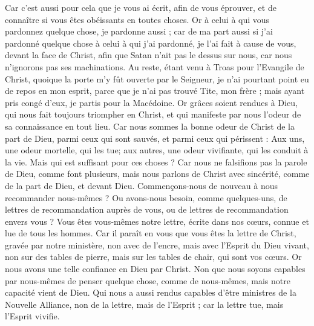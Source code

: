 \begin{multicols}{2}
Car c’est aussi pour cela que je vous ai écrit, afin de vous éprouver, et de connaître si vous êtes obéissants en toutes choses.
Or à celui à qui vous pardonnez quelque chose, je pardonne aussi ; car de ma part aussi si j'ai pardonné quelque chose à celui à qui j'ai pardonné, je l'ai fait à cause de vous, devant la face de Christ,
afin que Satan n'ait pas le dessus sur nous, car nous n'ignorons pas ses machinations.
Au reste, étant venu à Troas pour l'Evangile de Christ, quoique la porte m'y fût ouverte par le Seigneur, je n’ai pourtant point eu de repos en mon esprit, parce que je n'ai pas trouvé Tite, mon frère ;
mais ayant pris congé d'eux, je partis pour la Macédoine.
Or grâces soient rendues à Dieu, qui nous fait toujours triompher en Christ, et qui manifeste par nous l'odeur de sa connaissance en tout lieu.
Car nous sommes la bonne odeur de Christ de la part de Dieu, parmi ceux qui sont sauvés, et parmi ceux qui périssent :
Aux uns, une odeur mortelle, qui les tue; aux autres, une odeur vivifiante, qui les conduit à la vie. Mais qui est suffisant pour ces choses ?
Car nous ne falsifions pas la parole de Dieu, comme font plusieurs, mais nous parlons de Christ avec sincérité, comme de la part de Dieu, et devant Dieu.
\VerseOne{}Commençons-nous de nouveau à nous recommander nous-mêmes ? Ou avons-nous besoin, comme quelques-uns, de lettres de recommandation auprès de vous, ou de lettres de recommandation envers vous ?
Vous êtes vous-mêmes notre lettre, écrite dans nos cœurs, connue et lue de tous les hommes.
Car il paraît en vous que vous êtes la lettre de Christ, gravée par notre ministère, non avec de l'encre, mais avec l'Esprit du Dieu vivant, non sur des tables de pierre, mais sur les tables de chair, qui sont vos cœurs.
Or nous avons une telle confiance en Dieu par Christ.
Non que nous soyons capables par nous-mêmes de penser quelque chose, comme de nous-mêmes, mais notre capacité vient de Dieu.
Qui nous a aussi rendus capables d'être ministres de la Nouvelle Alliance, non de la lettre, mais de l'Esprit ; car la lettre tue, mais l'Esprit vivifie.

\end{multicols}
